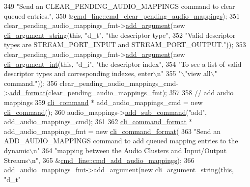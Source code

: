 \begin{DoxyCode}
349         \textcolor{stringliteral}{"Send an CLEAR\_PENDING\_AUDIO\_MAPPINGS command to clear queued entries."},
350         &\hyperlink{classcmd__line_a356ba780e37ba6b1bba426ca001b2e40}{cmd\_line::cmd\_clear\_pending\_audio\_mappings});
351     clear\_pending\_audio\_mappings\_fmt->\hyperlink{classcli__command__format_ac3fc6d13a227c195d5ee6f7b78eba9cd}{add\_argument}(\textcolor{keyword}{new} 
      \hyperlink{classcli__argument__string}{cli\_argument\_string}(\textcolor{keyword}{this}, \textcolor{stringliteral}{"d\_t"}, \textcolor{stringliteral}{"the descriptor type"},
352                                                                            \textcolor{stringliteral}{"Valid descriptor types are
       STREAM\_PORT\_INPUT and STREAM\_PORT\_OUTPUT."}));
353     clear\_pending\_audio\_mappings\_fmt->\hyperlink{classcli__command__format_ac3fc6d13a227c195d5ee6f7b78eba9cd}{add\_argument}(\textcolor{keyword}{new} 
      \hyperlink{classcli__argument__int}{cli\_argument\_int}(\textcolor{keyword}{this}, \textcolor{stringliteral}{"d\_i"}, \textcolor{stringliteral}{"the descriptor index"},
354                                                                         \textcolor{stringliteral}{"To see a list of valid descriptor
       types and corresponding indexes, enter\(\backslash\)n"}
355                                                                         \textcolor{stringliteral}{"\(\backslash\)"view all\(\backslash\)" command."}));
356     clear\_pending\_audio\_mappings\_cmd->\hyperlink{classcli__command_aa9ec38e761644d946f8db2b920e39921}{add\_format}(clear\_pending\_audio\_mappings\_fmt);
357 
358     \textcolor{comment}{// add audio mappings}
359     \hyperlink{classcli__command}{cli\_command} * add\_audio\_mappings\_cmd = \textcolor{keyword}{new} \hyperlink{classcli__command}{cli\_command}();
360     audio\_mappings->\hyperlink{classcli__command_aa73a67e8ebb6facd4b40ced66279b226}{add\_sub\_command}(\textcolor{stringliteral}{"add"}, add\_audio\_mappings\_cmd);
361 
362     \hyperlink{classcli__command__format}{cli\_command\_format} * add\_audio\_mappings\_fmt = \textcolor{keyword}{new} 
      \hyperlink{classcli__command__format}{cli\_command\_format}(
363         \textcolor{stringliteral}{"Send an ADD\_AUDIO\_MAPPINGS command to add queued mapping entries to the dynamic\(\backslash\)n"}
364         \textcolor{stringliteral}{"mapping between the Audio Clusters and Input/Output Streams\(\backslash\)n"},
365         &\hyperlink{classcmd__line_aaaee251fae097155da4f2be383551c7d}{cmd\_line::cmd\_add\_audio\_mappings});
366     add\_audio\_mappings\_fmt->\hyperlink{classcli__command__format_ac3fc6d13a227c195d5ee6f7b78eba9cd}{add\_argument}(\textcolor{keyword}{new} \hyperlink{classcli__argument__string}{cli\_argument\_string}(\textcolor{keyword}{this}, \textcolor{stringliteral}{"d\_t"}

\end{DoxyCode}
